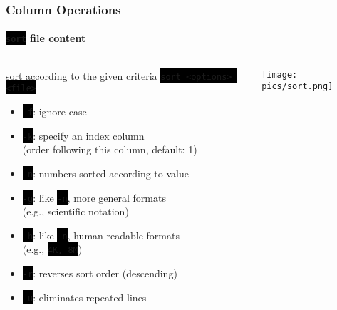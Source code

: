 \documentclass[unknownkeysallowed, 10pt, a4 paper, handout]{beamer}
\newcommand{\code}[1]{\colorbox{black}{\color{green}\texttt{#1}}}
\begin{document}
\begin{frame}
  \frametitle{Column Operations}
  \framesubtitle{\code{sort} file content}

  \begin{columns}
    \small{
    \begin{column}{0.65\textwidth}
      \begin{block}{sort according to the given criteria}
        \code{sort <options> <file>}
        \begin{itemize}
          \item \code{-f}: ignore case
          \item \code{-k}: specify an index column\\
            (order following this column, default: 1)
          \item \code{-n}: numbers sorted according to value\\
          \item \code{-g}: like \code{-n}, more general formats\\
            (e.g., scientific notation)
          \item \code{-h}: like \code{-n}, human-readable formats\\
            (e.g., \code{4K, 8M})
          \item \code{-r}: reverses sort order (descending)
          \item \code{-u}: eliminates repeated lines
        \end{itemize}
      \end{block}
    \end{column}
    }
    \begin{column}{0.35\textwidth}
      \texttt{[image: pics/sort.png]}
    \end{column}
  \end{columns}
\end{frame}
\end{document}
